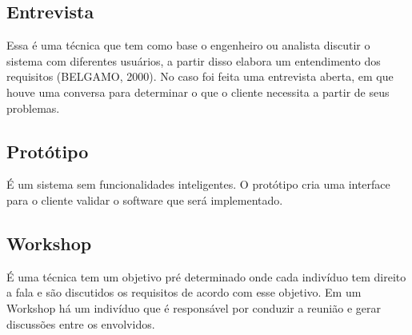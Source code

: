 \subsection{Entrevista}
\tab Essa é uma técnica que tem como base o engenheiro ou analista discutir o sistema com diferentes usuários, a partir disso elabora um entendimento dos requisitos (BELGAMO, 2000). No caso foi feita uma entrevista aberta, em que houve uma conversa para determinar o que o cliente necessita a partir de seus problemas.\\

\subsection{Protótipo}
\tab É um sistema sem funcionalidades inteligentes. O protótipo cria uma interface para o cliente validar o software que será implementado.\\

\subsection{Workshop}
\tab É uma técnica tem um objetivo pré determinado onde cada indivíduo tem direito a fala e são discutidos os requisitos de acordo com esse objetivo. Em um Workshop há um indivíduo que é responsável por conduzir a reunião e gerar discussões entre os envolvidos.\\

